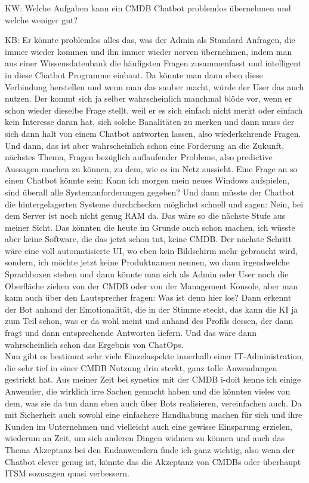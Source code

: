 \begin{list}{X:}{\setlength{\labelsep}{5mm}}
\item[KW:] Welche Aufgaben kann ein CMDB Chatbot problemlos übernehmen und welche weniger gut?
\item[KB:] Er könnte problemlos alles das, was der Admin als Standard Anfragen, die immer wieder kommen und ihn immer wieder nerven übernehmen, indem man aus einer Wissensdatenbank die häufigsten Fragen zusammenfasst und intelligent in diese Chatbot Programme einbaut.  Da könnte man dann eben diese Verbindung herstellen und wenn man das sauber macht, würde der User das auch nutzen. Der kommt sich ja selber wahrscheinlich manchmal blöde vor, wenn er schon wieder dieselbe Frage stellt, weil er es sich einfach nicht merkt oder einfach kein Interesse daran hat, sich solche Banalitäten zu merken und dann muss der sich dann halt von einem Chatbot antworten lassen, also wiederkehrende Fragen.\\ Und dann, das ist aber wahrscheinlich schon eine Forderung an die Zukunft, nächstes Thema, Fragen bezüglich auflaufender Probleme, also predictive Aussagen machen zu können, zu dem, wie es im Netz aussieht. Eine Frage an so einen Chatbot könnte sein: Kann ich morgen mein neues Windows aufspielen, sind überall alle Systemanforderungen gegeben? Und dann müsste der Chatbot die hintergelagerten Systeme durchchecken möglichst schnell und sagen: Nein, bei dem Server ist noch nicht genug RAM da. Das wäre so die nächste Stufe aus meiner Sicht. Das könnten die heute im Grunde auch schon machen, ich wüsste aber keine Software, die das jetzt schon tut, keine CMDB. Der nächste Schritt wäre eine voll automatisierte UI, wo eben kein Bildschirm mehr gebraucht wird, sondern, ich möchte jetzt keine Produktnamen nennen, wo dann irgendwelche Sprachboxen stehen und dann könnte man sich als Admin oder User noch die Oberfläche ziehen von der CMDB oder von der Management Konsole, aber man kann auch über den Lautsprecher fragen: Was ist denn hier los? Dann erkennt der Bot anhand der Emotionalität, die in der Stimme steckt, das kann die KI ja zum Teil schon, was er da wohl meint und anhand des Profils dessen, der dann fragt und dann entsprechende Antworten liefern. Und das wäre dann wahrscheinlich schon das Ergebnis von ChatOps.\\ Nun gibt es bestimmt sehr viele Einzelaspekte innerhalb einer IT-Administration, die sehr tief in einer CMDB Nutzung drin steckt, ganz tolle Anwendungen gestrickt hat. Aus meiner Zeit bei synetics mit der CMDB i-doit kenne ich einige Anwender, die wirklich irre Sachen gemacht haben und die könnten vieles von dem, was sie da tun dann eben auch über Bots realisieren, vereinfachen auch. Da mit Sicherheit auch sowohl eine einfachere Handhabung machen für sich und ihre Kunden im Unternehmen und vielleicht auch eine gewisse Einsparung erzielen, wiederum an Zeit, um sich anderen Dingen widmen zu können und auch das Thema Akzeptanz bei den Endanwendern finde ich ganz wichtig, also wenn der Chatbot clever genug ist, könnte das die Akzeptanz von CMDBs oder überhaupt ITSM sozusagen quasi verbessern. 

\end{list}
